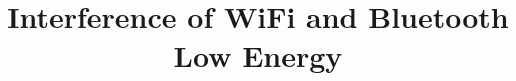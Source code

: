 \documentclass[twoside,journal,comsoc]{IEEEtran}
\begin{document}
\title{Interference of WiFi and Bluetooth Low Energy}



\maketitle

%

\IEEEpeerreviewmaketitle



\appendices


\balance{}



\end{document}
